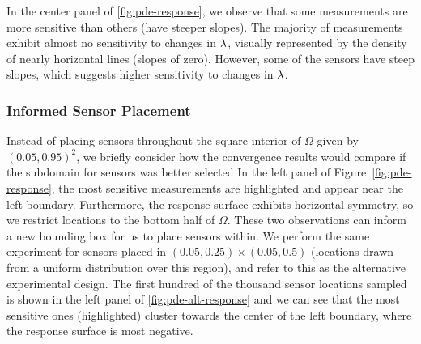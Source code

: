 In the center panel of \ref{fig:pde-response}, we observe that some measurements are more sensitive than others (have steeper slopes).
The majority of measurements exhibit almost no sensitivity to changes in $\lambda$, visually represented by the density of nearly horizontal lines (slopes of zero).
However, some of the sensors have steep slopes, which suggests higher sensitivity to changes in $\lambda$.


\subsubsection{Informed Sensor Placement}
Instead of placing sensors throughout the square interior of $\Omega$ given by $(0.05, 0.95)^2$, we briefly consider how the convergence results would compare if the subdomain for sensors was better selected
In the left panel of Figure~\ref{fig:pde-response}, the most sensitive measurements are highlighted and appear near the left boundary.
Furthermore, the response surface exhibits horizontal symmetry, so we restrict locations to the bottom half of $\Omega$.
These two observations can inform a new bounding box for us to place sensors within.
We perform the same experiment for sensors placed in $(0.05, 0.25)\times(0.05, 0.5)$ (locations drawn from a uniform distribution over this region), and refer to this as the alternative experimental design.
The first hundred of the thousand sensor locations sampled is shown in the left panel of \ref{fig:pde-alt-response} and we can see that the most sensitive ones (highlighted) cluster towards the center of the left boundary, where the response surface is most negative.


